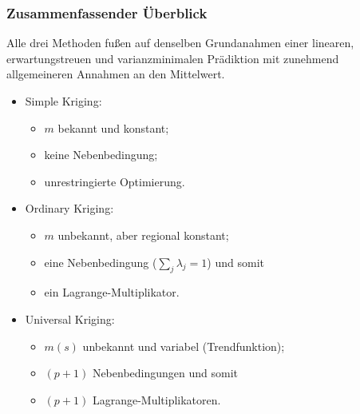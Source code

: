 \subsubsection{Zusammenfassender Überblick}
Alle drei Methoden fußen auf denselben 
Grundanahmen einer linearen, erwartungstreuen und
varianzminimalen Prädiktion mit zunehmend allgemeineren 
Annahmen an den Mittelwert.

\begin{itemize}[topsep=2pt,parsep=1pt,itemsep=0.5pt]
\item[$\circ$] Simple Kriging: 
\begin{itemize}[topsep=2pt,parsep=1pt,itemsep=0.5pt]
\item[$\triangleright $] $m$ bekannt und konstant; 
\item[$\triangleright $] keine Nebenbedingung; 
\item[$\triangleright $] unrestringierte Optimierung.
\end{itemize}
\item[$\circ$] Ordinary Kriging: 
\begin{itemize}[topsep=2pt,parsep=1pt,itemsep=0.5pt]
\item[$\triangleright $] $m$ unbekannt, aber regional konstant;
\item[$\triangleright $] eine Nebenbedingung ($\sum_j \lambda_j = 1$) und somit
\item[$\triangleright $] ein Lagrange-Multiplikator.
\end{itemize}
\item[$\circ$] Universal Kriging: 
\begin{itemize}[topsep=2pt,parsep=1pt,itemsep=0.5pt]
\item[$\triangleright $] $m(s)$ unbekannt und variabel (Trendfunktion); 
\item[$\triangleright $] $(p+1)$ Nebenbedingungen und somit 
\item[$\triangleright $] $(p+1)$ Lagrange-Multiplikatoren.
\end{itemize}
\end{itemize}

